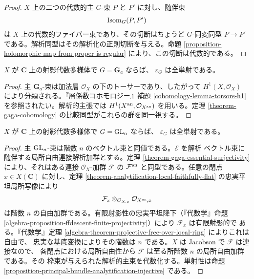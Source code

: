 \begin{proof}
$X$ 上の二つの代数的主 $G$-束 $P$ と $P'$ に対し、随伴束
$$
\mathop{\rm Isom}\nolimits_G(P,P')
$$
は $X$ 上の代数的ファイバー束であり、その切断はちょうど $G$-同変同型
$P\to P'$ である。解析同型はその解析化の正則切断を与える。命題
\ref{proposition-holomorphic-map-from-proper-is-regular} により、この切断は代数的である。
\end{proof}

\begin{proposition}
\label{proposition-additive-principal-bundles-gaga}
\begin{reference}
\cite[\S 4、第20項、命題17]{GAGA}
\end{reference}
$X$ が $\mathbf C$ 上の射影代数多様体で $G=\mathbf G_a$ ならば、
$\varepsilon_G$ は全単射である。
\end{proposition}

\begin{proof}
主 $\mathbf G_a$-束は加法層 $\mathcal O_X$ の下のトーサーであり、したがって
$H^1(X,\mathcal O_X)$ により分類される。『層係数コホモロジー』補題
\ref{cohomology-lemma-torsors-h1} を参照されたい。解析的主張では
$H^1(X^{\rm an},\mathcal O_{X^{\rm an}})$ を用いる。定理
\ref{theorem-gaga-cohomology} の比較同型がこれらの群を同一視する。
\end{proof}

\begin{proposition}
\label{proposition-general-linear-principal-bundles-gaga}
\begin{reference}
\cite[\S 4、第20項、命題18]{GAGA}
\end{reference}
$X$ が $\mathbf C$ 上の射影代数多様体で $G=\mathop{\rm GL}_n$ ならば、
$\varepsilon_G$ は全単射である。
\end{proposition}

\begin{proof}
主 $\mathop{\rm GL}_n$-束は階数 $n$ のベクトル束と同値である。$\mathcal E$ を解析
ベクトル束に随伴する局所自由連接解析加群とする。定理
\ref{theorem-gaga-essential-surjectivity} により、それはある連接
$\mathcal O_X$-加群 $\mathcal F$ の $\mathcal F^{\rm an}$ と同型である。任意の閉点
$x\in X(\mathbf C)$ に対し、定理
\ref{theorem-analytification-local-faithfully-flat} の忠実平坦局所写像により
$$
\mathcal F_x\otimes_{\mathcal O_{X,x}}
\mathcal O_{X^{\rm an},x}
$$
は階数 $n$ の自由加群である。有限射影性の忠実平坦降下（『代数学』命題
\ref{algebra-proposition-ffdescent-finite-projectivity}）により $\mathcal F_x$ は有限射影的で
ある。『代数学』定理 \ref{algebra-theorem-projective-free-over-local-ring} によりこれは自由で、
忠実な基底変換によりその階数は $n$ である。$X$ は Jacobson で $\mathcal F$ は連接なので、
各閉点における局所自由性から $\mathcal F$ は至る所階数 $n$ の局所自由加群である。その
枠束が与えられた解析的主束を代数化する。単射性は命題
\ref{proposition-principal-bundle-analytification-injective} である。
\end{proof}

